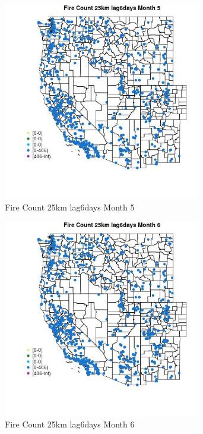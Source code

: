 \begin{figure} 
\centering  
\includegraphics[width=0.77\textwidth]{Code_Outputs/Report_ML_input_PM25_Step4_part_f_de_duplicated_aves_prioritize_24hr_obswNAs_MapObsMo5Fire_Count_25km_lag6days.jpg} 
\caption{\label{fig:Report_ML_input_PM25_Step4_part_f_de_duplicated_aves_prioritize_24hr_obswNAsMapObsMo5Fire_Count_25km_lag6days}Fire Count 25km lag6days Month 5} 
\end{figure} 
 

\begin{figure} 
\centering  
\includegraphics[width=0.77\textwidth]{Code_Outputs/Report_ML_input_PM25_Step4_part_f_de_duplicated_aves_prioritize_24hr_obswNAs_MapObsMo6Fire_Count_25km_lag6days.jpg} 
\caption{\label{fig:Report_ML_input_PM25_Step4_part_f_de_duplicated_aves_prioritize_24hr_obswNAsMapObsMo6Fire_Count_25km_lag6days}Fire Count 25km lag6days Month 6} 
\end{figure} 
 

